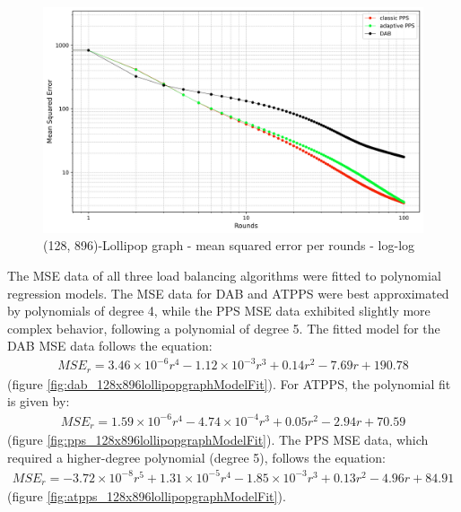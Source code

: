 \begin{figure}[]
    \centering
    \includegraphics[width=\linewidth]{figures/Simulation_outcomes/LollipopGraph/128_896/DAB_vs_PPS_LG_r100_n1024_averaged_loglog.png}
    \caption{(128, 896)-Lollipop graph - mean squared error per rounds - log-log}
    \label{fig:128_896lollipopgraphMSEperRoundLogLog}
\end{figure}

The MSE data of all three load balancing algorithms were fitted to polynomial regression models. The MSE data for DAB and ATPPS were best approximated by polynomials of degree 4, while the PPS MSE data exhibited slightly more complex behavior, following a polynomial of degree 5. The fitted model for the DAB MSE data follows the equation: 
\begin{align}
    MSE_r=3.46\times 10^{-6}r^{4}-1.12\times 10^{-3}r^{3}+0.14r^{2}-7.69r+190.78    
\end{align}
(figure \ref{fig:dab_128x896lollipopgraphModelFit}). For ATPPS, the polynomial fit is given by:
\begin{align}
    MSE_r=1.59\times 10^{-6}r^{4}-4.74\times 10^{-4}r^{3}+0.05r^{2}-2.94r+70.59    
\end{align}
(figure \ref{fig:pps_128x896lollipopgraphModelFit}). The PPS MSE data, which required a higher-degree polynomial (degree 5), follows the equation:
\begin{align}
    MSE_r=-3.72\times10^{-8}r^{5}+1.31\times 10^{-5}r^{4}-1.85\times 10^{-3}r^{3}+0.13r^{2}-4.96r+84.91    
\end{align}
(figure \ref{fig:atpps_128x896lollipopgraphModelFit}).

